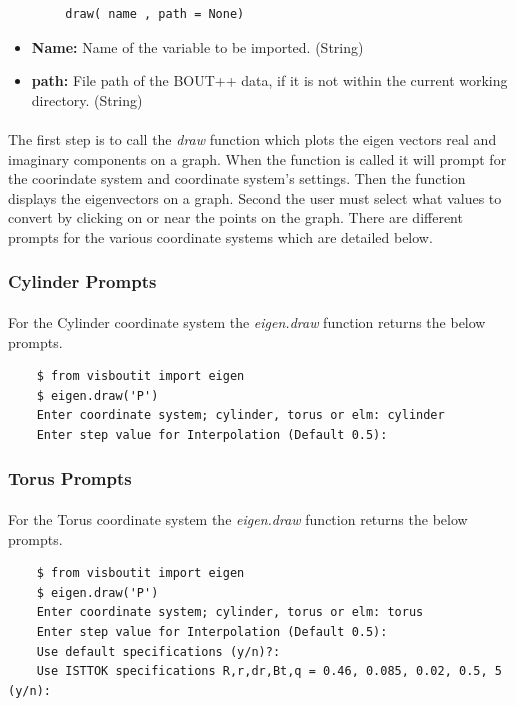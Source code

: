 \documentclass[12pt,a4paper]{article}
\begin{document}
	\begin{verbatim}
		draw( name , path = None)
	\end{verbatim}
	
	\begin{itemize}
		\item{\textbf{Name:} Name of the variable to be imported. (String)}
		\item{\textbf{path:} File path of the BOUT++ data, if it is not within the current working directory. (String)}
	\end{itemize}
	
	\paragraph{}
	The first step is to call the \textit{draw} function which plots the eigen vectors real and imaginary components on a graph. When the function is called it will prompt for the coorindate system and coordinate system's settings. Then the function displays the eigenvectors on a graph. Second the user must select what values to convert by clicking on or near the points on the graph. There are different prompts for the various coordinate systems which are detailed below.
	
	\subsubsection{Cylinder Prompts}
	\paragraph{}
	For the Cylinder coordinate system the \textit{eigen.draw} function returns the below prompts.
	\begin{verbatim}
	$ from visboutit import eigen
	$ eigen.draw('P')
	Enter coordinate system; cylinder, torus or elm: cylinder
	Enter step value for Interpolation (Default 0.5): 
	\end{verbatim}
	
	\subsubsection{Torus Prompts}
	\paragraph{}
	For the Torus coordinate system the \textit{eigen.draw} function returns the below prompts.
	\begin{verbatim}
	$ from visboutit import eigen
	$ eigen.draw('P')
	Enter coordinate system; cylinder, torus or elm: torus
	Enter step value for Interpolation (Default 0.5): 
	Use default specifications (y/n)?: 
	Use ISTTOK specifications R,r,dr,Bt,q = 0.46, 0.085, 0.02, 0.5, 5 (y/n):
	\end{verbatim}
	
\end{document}
